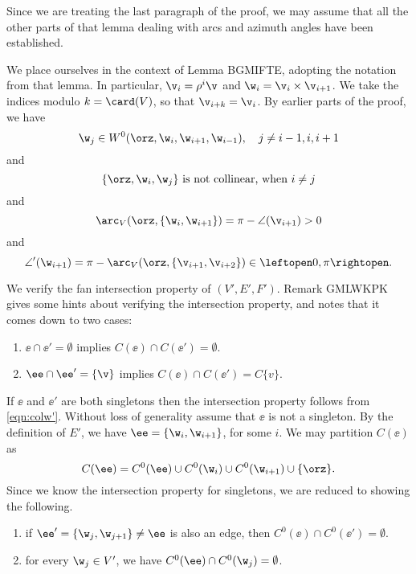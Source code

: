 Since we are treating the last paragraph of the
proof, we may assume that all the other parts of that lemma dealing
with arcs and azimuth angles have been established.

We place ourselves in the context of Lemma BGMIFTE, adopting the
notation from that lemma.  
In particular, $\v_i = \rho^i\v$ and
$\w_i = \v_i \times \v_{i+1}$.  
We take the indices modulo $k=\card(V)$, so that $\v_{i+k}=\v_i$.
By earlier parts of the proof, we have
\begin{equation}\label{eqn:wj'}
\w_j\in W^0(\orz,\w_{i},\w_{i+1},\w_{i-1}),\quad j\ne i-1, i, i+1
\end{equation}
and
\begin{equation}\label{eqn:colw'}
\{\orz,\w_i,\w_j\} \text{ is not collinear, when } i\ne j
\end{equation}  
and
\begin{equation}\label{eqn:arcV'}
\arc_V(\orz,\{\w_i,\w_{i+1}\}) 
=\pi - \angle(\v_{i+1}) >0
\end{equation}
and
\begin{equation}\label{eqn:angle'}
\angle'(\w_{i+1}) 
=\pi -\arc_V(\orz,\{\v_{i+1},\v_{i+2}\})  \in\leftopen 0,\pi\rightopen.
\end{equation}

We verify the fan intersection property of $(V',E',F')$.  Remark GMLWKPK gives
some hints about verifying the intersection property, and notes that it comes
down to two cases:
\begin{enumerate}
\item $\ee\cap \ee' = \emptyset$ implies $C(\ee)\cap C(\ee') = \emptyset$.
\item $\ee\cap\ee' = \{\v\}$ implies $C(\ee)\cap C(\ee') = C\{v\}$.
\end{enumerate}
If $\ee$ and $\ee'$ are both singletons then the intersection property
follows from \eqref{eqn:colw'}.  Without loss of generality assume that $\ee$ is
not a singleton.  By the definition of $E'$, we have 
 $\ee=\{\w_i,\w_{i+1} \}$, for some $i$.  We may partition $C(\ee)$ as
\[
C(\ee) = C^0(\ee) \cup C^0(\w_i) \cup C^0(\w_{i+1})\cup \{\orz\}.
\]
Since we know the intersection property for singletons, we are reduced to showing
the following.
\begin{enumerate}
\item if $\ee'=\{\w_j,\w_{j+1}\}\ne\ee$ is also an edge, then  $C^0(\ee)\cap C^0(\ee')=\emptyset$.
\item for every $\w_j\in V'$, we have $C^0(\ee) \cap C^0(\w_j)=\emptyset$.
\end{enumerate}

